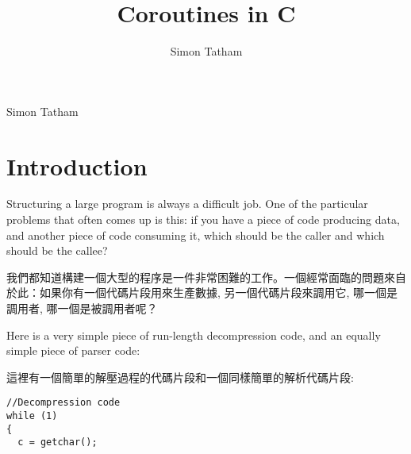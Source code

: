\documentclass[12pt]{article}
\title{Coroutines in C}
\author{Simon Tatham}
\begin{document}
\maketitle

%

\newpage
\tableofcontents
\newpage

\begin{CJK}{UTF8}{bsmi} %
\begin{comment}
.oO Phrack 49 Oo.

Volume Seven, Issue Forty Nine File 14 of 16

BugTraq, r00t, and Underground.Org

 bring you

\end{comment}

\begin{center}
Simon Tatham

\end{center}
\section{Introduction}

 Structuring a large program is always a difficult job. One of the particular problems that often comes up is this: if you have a piece of code producing data, and another piece of code consuming it, which should be the caller and which should be the callee?

我們都知道構建一個大型的程序是一件非常困難的工作。一個經常面臨的問題來自於此：如果你有一個代碼片段用來生產數據, 另一個代碼片段來調用它, 哪一個是調用者, 哪一個是被調用者呢？

 Here is a very simple piece of run-length decompression code, and an equally simple piece of parser code: 


這裡有一個簡單的解壓過程的代碼片段和一個同樣簡單的解析代碼片段: 

\newpage
\begin{multicols}{2}

\begin{lstlisting}[caption=decompression, basicstyle=\footnotesize, breaklines=true, frame=single,frameround=tttt]
//Decompression code
while (1) 
{
  c = getchar();


\end{lstlisting}
\end{multicols}
\end{CJK}
\end{document}
